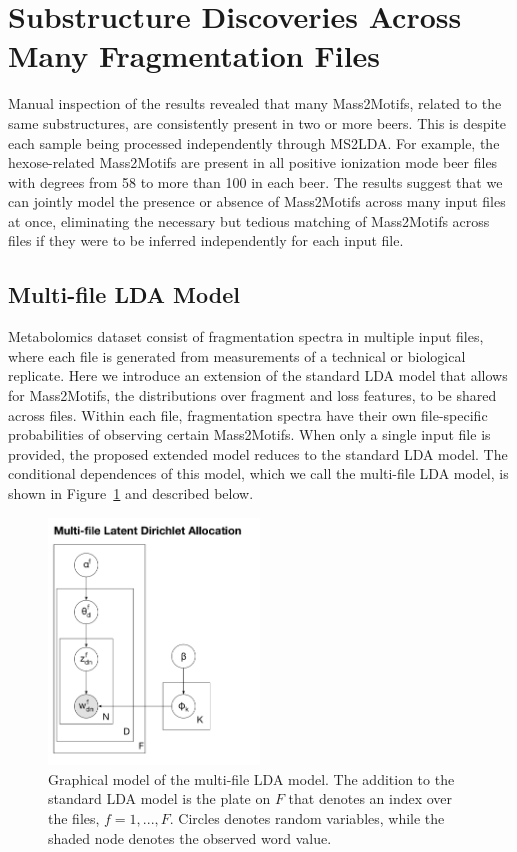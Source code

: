 \section{Substructure Discoveries Across Many Fragmentation Files}

Manual inspection of the results revealed that many Mass2Motifs, related to the same substructures, are consistently present in two or more beers. This is despite each sample being processed independently through MS2LDA. For example, the hexose-related Mass2Motifs are present in all positive ionization mode beer files with degrees from 58 to more than 100 in each beer. The results suggest that we can jointly model the presence or absence of Mass2Motifs across many input files at once, eliminating the necessary but tedious matching of Mass2Motifs across files if they were to be inferred independently for each input file.

\subsection{Multi-file LDA Model}

Metabolomics dataset consist of fragmentation spectra in multiple input files, where each file is generated from measurements of a technical or biological replicate. Here we introduce an extension of the standard LDA model that allows for Mass2Motifs, the distributions over fragment and loss features, to be shared across files. Within each file, fragmentation spectra have their own file-specific probabilities of observing certain Mass2Motifs. When only a single input file is provided, the proposed extended model reduces to the standard LDA model. The conditional dependences of this model, which we call the multi-file LDA model, is shown in Figure~\ref{fig:lda-multifile-lda-diagram} and described below.

\begin{figure}[tbh!]
\noindent \begin{centering}
\includegraphics[width=0.5\textwidth]{07-lda/figures/multifile_lda.pdf}
\par\end{centering}
\caption{\label{fig:lda-multifile-lda-diagram}Graphical model of the multi-file LDA model. The addition to the standard LDA model is the plate on $F$ that denotes an index over the files, $f=1,...,F$. Circles denotes random variables, while the shaded node denotes the observed word value.}
\end{figure}


